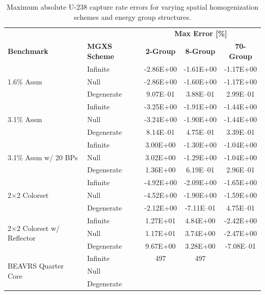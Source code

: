 \begin{table}[h!]
  \centering
  \caption[Maximum OpenMOC U-238 capture rate errors]{Maximum absolute U-238 capture rate errors for varying spatial homogenization schemes and energy group structures.}
  \small
  \label{table:chap8-openmoc-max-capt-rates}
  \vspace{6pt}
  \begin{tabular}{l l c c c}
  \toprule
  \rowcolor{lightgray}
  & & \multicolumn{3}{c}{\cellcolor{lightgray} \textbf{Max Error [\%]}} \\
  \multirow{-2}{*}{\cellcolor{lightgray} \bf Benchmark} &
  \multirow{-2}{*}{\cellcolor{lightgray} \bf \ac{MGXS} Scheme} &
  \multicolumn{1}{c}{{\cellcolor{lightgray} \bf 2-Group}} &
  \multicolumn{1}{c}{{\cellcolor{lightgray} \bf 8-Group}} &
  \multicolumn{1}{c}{{\cellcolor{lightgray} \bf 70-Group}} \\
  \midrule
\multirow{3}{*}{\parbox{2.5cm}{1.6\% Assm}} & Infinite & -2.86E+00 & -1.61E+00 & -1.17E+00 \\
& Null & -2.86E+00 & -1.60E+00 & -1.17E+00 \\
& Degenerate & 9.07E--01 & 3.88E--01 & 2.99E--01 \\
  \midrule
\multirow{3}{*}{\parbox{2.5cm}{3.1\% Assm}} & Infinite & -3.25E+00 & -1.91E+00 & -1.44E+00 \\
& Null & -3.24E+00 & -1.90E+00 & -1.44E+00 \\
& Degenerate & 8.14E--01 & 4.75E--01 & 3.39E--01 \\
  \midrule
\multirow{3}{*}{\parbox{2.5cm}{3.1\% Assm w/ 20 BPs}} & Infinite & 3.00E+00 & -1.30E+00 & -1.04E+00 \\
& Null & 3.02E+00 & -1.29E+00 & -1.04E+00 \\
& Degenerate & 1.36E+00 & 6.19E--01 & 2.96E--01 \\
  \midrule
\multirow{3}{*}{\parbox{2.5cm}{2$\times$2 Colorset}} & Infinite & -4.92E+00 & -2.09E+00 & -1.65E+00 \\
& Null & -4.52E+00 & -1.90E+00 & -1.59E+00 \\
& Degenerate & -2.12E+00 & -7.11E--01 & 4.75E--01 \\
  \midrule
\multirow{3}{*}{\parbox{2.5cm}{2$\times$2 Colorset w/ Reflector}} & Infinite & 1.27E+01 & 4.84E+00 & -2.42E+00 \\
& Null & 1.17E+01 & 3.74E+00 & -2.47E+00 \\
& Degenerate & 9.67E+00 & 3.28E+00 & -7.08E--01 \\
  \midrule
  \multirow{3}{*}{\parbox{2cm}{\ac{BEAVRS} Quarter Core}} & Infinite & 497 & 497 & \\
  & Null & & & \\
  & Degenerate & & & \\
  \bottomrule
\end{tabular}
\end{table}

